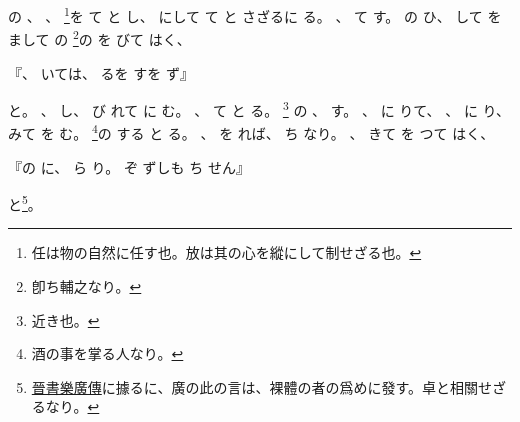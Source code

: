 \documentclass[a4paper,12pt]{article}
\begin{document}
の%
、%
、%
\footnote{任は物の自然に任す也。放は其の心を縱にして制せざる也。}を%
て%
と%
し、%
%
にして%
て%
と%
さざるに%
る。%
、%
て%
す。%
の%
%
%
ひ、%
して%
を%
まして%
の%
\footnote{卽ち輔之なり。}の%
を%
びて%
はく、%
\begin{quoting}
『、%
%
いては、%
るを%
すを%
ず』
\end{quoting}
と。%
、%
し、%
び%
れて%
に%
む。%
、%
て%
と%
る。%
\footnote{近き也。}%
の%
、%
す。%
、%
に%
りて、%
、%
に%
り、%
みて%
を%
む。%
\footnote{酒の事を掌る人なり。}の%
する%
と%
る。%
、%
を%
れば、%
ち%
なり。%
、%
きて%
を%
つて%
はく、%
\begin{quoting}
『の%
に、%
ら%
%
り。%
ぞ%
ずしも%
ち%
せん』%
\end{quoting}
と\footnote{\href{https://zh.wikisource.org/wiki/\%E6\%99\%89\%E6\%9B\%B8/\%E5\%8D\%B7043\#\%E6\%A8\%82\%E5\%BB\%A3}{晉書樂廣傳}に據るに、廣の此の言は、裸體の者の爲めに發す。卓と相關せざるなり。}。%
\end{document}
